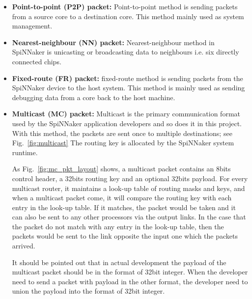 \begin{itemize}
    \item \textbf{Point-to-point (P2P) packet:} Point-to-point method is sending packets from a source core to a destination core. This method mainly used as system management.
    
    \item \textbf{Nearest-neighbour (NN) packet:} Nearest-neighbour method in SpiNNaker is unicasting or broadcasting data to neighbours i.e. six directly connected chips.
    
    \item \textbf{Fixed-route (FR) packet:} fixed-route method is sending packets from the SpiNNaker device to the host system. This method is mainly used as sending debugging data from a core back to the host machine.
    
    \item \textbf{Multicast (MC) packet:} Multicast is the primary communication format used by the SpiNNaker application developers and so does it in this project. With this method, the packets are sent once to multiple destinations; see Fig.~\ref{fig:multicast}  The routing key is allocated by the SpiNNaker system runtime. 
    
    As Fig.~\ref{fig:mc_pkt_layout} shows, a multicast packet contains an 8bits control header, a 32bits routing key and an optional 32bits payload. For every multicast router, it maintains a look-up table of routing masks and keys, and when a multicast packet come, it will compare the routing key with each entry in the look-up table. If it matches, the packet would be taken and it can also be sent to any other processors via the output links. In the case that the packet do not match with any entry in the look-up table, then the packets would be sent to the link opposite the input one which the packets arrived.
    
    It should be pointed out that in actual development the payload of the multicast packet should be in the format of 32bit integer. When the developer need to send a packet with payload in the other format, the developer need to union the payload into the format of 32bit integer.
\begin{figure}[!ht]
    \centering
    

\end{figure}
\end{itemize}
